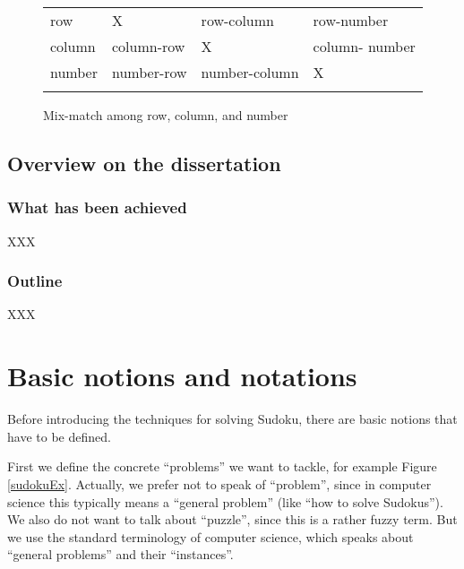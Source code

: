 \documentclass[11pt]{report}
\begin{document}
\begin{figure}[htbp]
\setlength{\tabcolsep}{3pt}
\renewcommand{\arraystretch}{2}
\begin{center}
\begin{tabular}{ >{\centering\arraybackslash}m{0.6in}|| >{\centering\arraybackslash}m{1.2in}|| >{\centering\arraybackslash}m{1.2in}|| >{\centering\arraybackslash}m{1.2in}||}
\multicolumn{1}{c}{} & \multicolumn{1}{c}{row} & \multicolumn{1}{c}{column} & \multicolumn{1}{c}{number}\\ \cline{2-4}
row & X & row-column & row-number\\ \cline{2-4}
column & column-row \cellcolor[gray]{.8}& X& column- number\\ \cline{2-4}
number & number-row \cellcolor[gray]{.8}& number-column \cellcolor[gray]{.8}& X\\ \cline{2-4}
\end{tabular}
\end{center}
\caption{Mix-match among row, column, and number}
\label{fig:mixmatch}
\end{figure}


\section{Overview on the dissertation}
\label{sec:overview}


\subsection{What has been achieved}
\label{sec:whatachieved}

XXX



\subsection{Outline}
\label{sec:Outline}

XXX




\chapter{Basic notions and notations}
\label{cha:basicnotnotat}

Before introducing the techniques for solving Sudoku, there are basic notions that have to be defined.

First we define the concrete ``problems'' we want to tackle, for example Figure \ref{sudokuEx}. Actually, we prefer not to speak of ``problem'', since in computer science this typically means a ``general problem'' (like ``how to solve Sudokus''). We also do not want to talk about ``puzzle'', since this is a rather fuzzy term. But we use the standard terminology of computer science, which speaks about ``general problems'' and their ``instances''.
\end{document}

